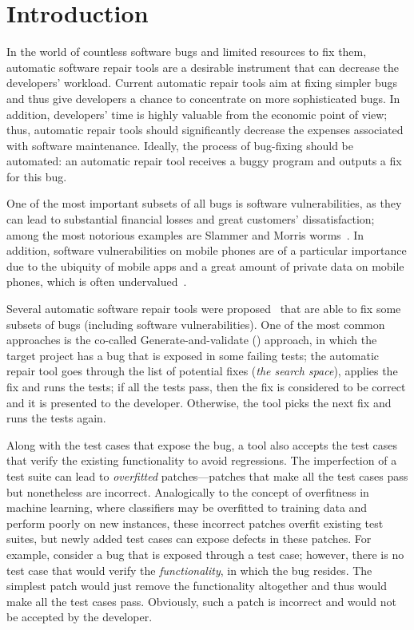 \section{Introduction}

In the world of countless software bugs and limited resources to fix them, automatic software repair tools are a desirable instrument that can decrease the developers' workload.
Current automatic repair tools aim at fixing simpler bugs and thus give developers a chance to concentrate on more sophisticated bugs.
In addition, developers' time is highly valuable from the economic point of view; thus, automatic repair tools should significantly decrease the expenses  associated with software maintenance.
Ideally, the process of bug-fixing should be automated: an automatic repair tool receives a buggy program and outputs a fix for this bug.

One of the most important subsets of all bugs is software vulnerabilities, as they can lead to substantial financial losses and great customers' dissatisfaction; among the most notorious examples are Slammer and Morris worms~\cite{moore2003inside, streak2003morris}.
In addition, software vulnerabilities on mobile phones are of a particular importance due to the ubiquity of mobile apps and a great amount of private data on mobile phones, which is often undervalued~\cite{egelman2014you}.

Several automatic software repair tools were proposed~\cite{le2012systematic, long2015staged, mechtaev2016angelix} that are able to fix some subsets of bugs (including software vulnerabilities).
One of the most common approaches is the co-called Generate-and-validate (\GV) approach, in which the target project has a bug that is exposed in some failing tests; the automatic repair tool goes through the list of potential fixes (\emph{the search space}), applies the fix and runs the tests; if all the tests pass, then the fix is considered to be correct and it is presented to the developer.
Otherwise, the tool picks the next fix and runs the tests again.

Along with the test cases that expose the bug, a \GV tool also accepts the test cases that verify the existing functionality to avoid regressions.
The imperfection of a test suite can lead to \emph{overfitted} patches---patches that make all the test cases pass but nonetheless are incorrect.
Analogically to the concept of overfitness in machine learning, where classifiers may be overfitted to training data and perform poorly on new instances, these incorrect patches overfit existing test suites, but newly added test cases can expose defects in these patches.
For example, consider a bug that is exposed through a test case; however, there is no test case that would verify the \emph{functionality}, in which the bug resides.
The simplest patch would just remove the functionality altogether and thus would make all the test cases pass.
Obviously, such a patch is incorrect and would not be accepted by the developer.


